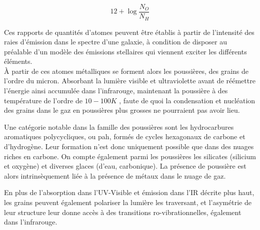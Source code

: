 \documentclass[12pt, a4paper]{article}
\begin{document}
\begin{equation}
  \label{eq:abundance}
  12 + \log{\frac{N_O}{N_H}}
\end{equation}

Ces rapports de quantités d'atomes peuvent être établis à partir de l'intensité des raies d'émission dans le spectre d'une galaxie, à condition de disposer au préalable d'un modèle des émissions stellaires qui viennent exciter les différents éléments.\\

À partir de ces atomes métalliques se forment alors les poussières, des grains de l'ordre du micron. Absorbant la lumière visible et ultraviolette avant de réémettre l'énergie ainsi accumulée dans l'infrarouge, maintenant la poussière à des température de l'ordre de $10 - 100K$ \parencite{Astrophysics-of-the-Diffuse-Universe}, faute de quoi la condensation et nucléation des grains dans le gaz en poussières plus grosses ne pourraient pas avoir lieu.

Une catégorie notable dans la famille des poussières sont les hydrocarbures aromatiques polycycliques, ou \gls{pah}, formés de cycles hexagonaux de carbone et d'hydrogène. Leur formation n'est donc uniquement possible que dans des nuages riches en carbone. On compte également parmi les poussières les silicates (silicium et oxygène) et diverses glaces (d'eau, carbonique). La présence de poussière est alors intrinsèquement liée à la présence de métaux dans le nuage de gaz.

En plus de l'absorption dans l'UV-Visible et émission dans l'IR décrite plus haut, les grains peuvent également polariser la lumière les traversant, et l'asymétrie de leur structure leur donne accès à des transitions ro-vibrationnelles, également dans l'infrarouge.\\
\end{document}
